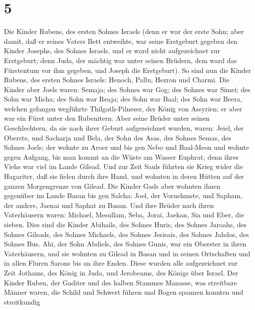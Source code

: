 \hypertarget{section-4}{%
\section{5}\label{section-4}}

 Die Kinder Rubens, des ersten Sohnes Israels (denn er war
der erste Sohn; aber damit, daß er seines Vaters Bett entweihte, war
seine Erstgeburt gegeben den Kinder Josephs, des Sohnes Israels, und er
ward nicht aufgezeichnet zur Erstgeburt;  denn Juda, der
mächtig war unter seinen Brüdern, dem ward das Fürstentum vor ihm
gegeben, und Joseph die Erstgeburt).  So sind nun die Kinder
Rubens, des ersten Sohnes Israels: Henoch, Pallu, Hezron und Charmi.
 Die Kinder aber Joels waren: Semaja; des Sohnes war Gog;
des Sohnes war Simei;  des Sohn war Micha; des Sohn war
Reaja; des Sohn war Baal;  des Sohn war Beera, welchen
gefangen wegführte Thilgath-Pilneser, der König von Assyrien; er aber
war ein Fürst unter den Rubenitern.  Aber seine Brüder unter
seinen Geschlechtern, da sie nach ihrer Geburt aufgezeichnet wurden,
waren: Jeiel, der Oberste, und Sacharja  und Bela, der Sohn
des Asas, des Sohnes Semas, des Sohnes Joels; der wohnte zu Aroer und
bis gen Nebo und Baal-Meon  und wohnte gegen Aufgang, bis
man kommt an die Wüste am Wasser Euphrat; denn ihres Viehs war viel im
Lande Gilead.  Und zur Zeit Sauls führten sie Krieg wider
die Hagariter, daß sie fielen durch ihre Hand, und wohnten in deren
Hütten auf der ganzen Morgengrenze von Gilead.  Die Kinder
Gads aber wohnten ihnen gegenüber im Lande Basan bis gen Salcha:
 Joel, der Vornehmste, und Sapham, der andere, Jaenai und
Saphat zu Basan.  Und ihre Brüder nach ihren Vaterhäusern
waren: Michael, Mesullam, Seba, Jorai, Jaekan, Sia und Eber, die sieben.
 Dies sind die Kinder Abihails, des Sohnes Huris, des
Sohnes Jaroahs, des Sohnes Gileads, des Sohnes Michaels, des Sohnes
Jesisais, des Sohnes Jahdos, des Sohnes Bus.  Ahi, der Sohn
Abdiels, des Sohnes Gunis, war ein Oberster in ihren Vaterhäusern,
 und sie wohnten zu Gilead in Basan und in seinen
Ortschaften und in allen Fluren Sarons bis an ihre Enden. 
Diese wurden alle aufgezeichnet zur Zeit Jothams, des König in Juda, und
Jerobeams, des Königs über Israel.  Der Kinder Ruben, der
Gaditer und des halben Stammes Manasse, was streitbare Männer waren, die
Schild und Schwert führen und Bogen spannen konnten und streitkundig
